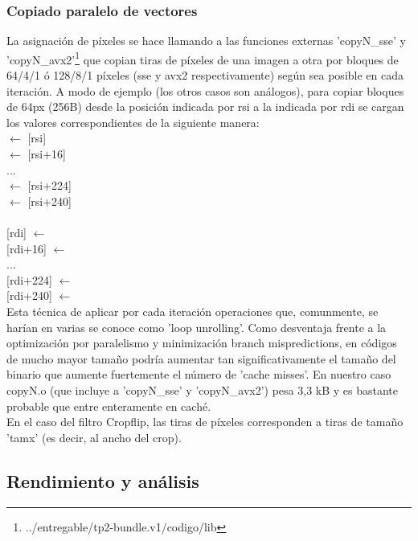 \subsubsection{Copiado paralelo de vectores}
\label{explicacionCopyN}

La asignación de píxeles se hace llamando a las funciones externas 'copyN_sse' y 'copyN_avx2'\footnote{../entregable/tp2-bundle.v1/codigo/lib} que copian tiras de píxeles de una imagen a otra por bloques de 64/4/1 ó 128/8/1 píxeles (sse y avx2 respectivamente) según sea posible en cada iteración. A modo de ejemplo (los otros casos son análogos), para copiar bloques de 64px (256B) desde la posición indicada por rsi a la indicada por rdi se cargan los valores correspondientes de la siguiente manera:
\newline
\\
 $\leftarrow$ {[rsi]} \\
 $\leftarrow$ {[rsi+16]} \\
... \\
 $\leftarrow$ {[rsi+224]}  \\
 $\leftarrow$ {[rsi+240]} \\
\\
{[rdi]} $\leftarrow$  \\
{[rdi+16]} $\leftarrow$  \\
... \\
{[rdi+224]} $\leftarrow$  \\
{[rdi+240]} $\leftarrow$  \\

Esta técnica de aplicar por cada iteración operaciones que, comunmente, se harían en varias se conoce como 'loop unrolling'. Como desventaja frente a la optimización por paralelismo y minimización branch mispredictions, en códigos de mucho mayor tamaño podría aumentar tan significativamente el tamaño del binario que aumente fuertemente el número de 'cache misses'. En nuestro caso copyN.o (que incluye a 'copyN_sse' y 'copyN_avx2') pesa 3,3 kB y es bastante probable que entre enteramente en caché.
\\

En el caso del filtro Cropflip, las tiras de píxeles corresponden a tiras de tamaño 'tamx' (es decir, al ancho del crop).  


\subsection{Rendimiento y análisis}


